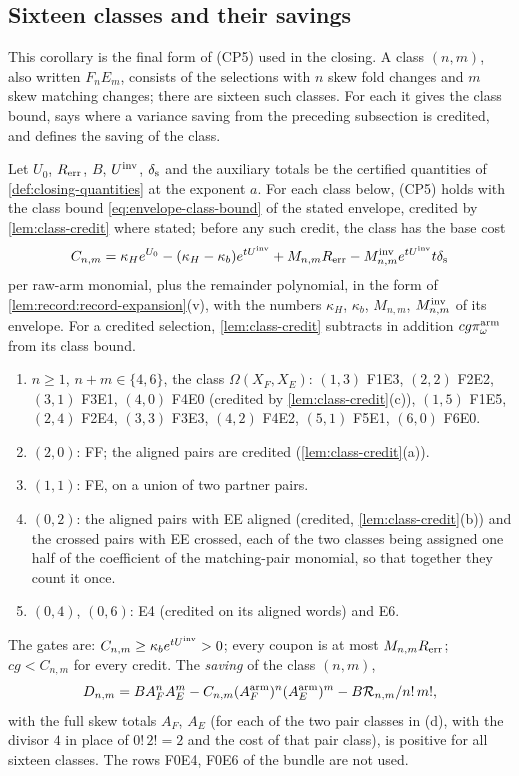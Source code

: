 \subsection{Sixteen classes and their savings}\label{subsec:envelope-costs}

This corollary is the final form of (CP5) used in the closing. A
class $(n,m)$, also written $F_nE_m$, consists of the selections
with $n$ skew fold changes and $m$ skew matching changes; there
are sixteen such classes. For each it gives the class bound, says
where a variance saving from the preceding subsection is credited,
and defines the saving of the class.

\begin{corollary}\label{cor:envelope-costs}
Let $U_0$, $R_{\rm err}$, $B$, $\Uinv$, $\delta_{\rm s}$ and the auxiliary totals be the
certified quantities of \cref{def:closing-quantities} at the exponent $a$. For each
class below, (CP5) holds with the class bound \eqref{eq:envelope-class-bound} of the
stated envelope, credited by \cref{lem:class-credit} where stated; before any such credit, the class has the base cost
\[
 C_{n,m}=\kappa_He^{U_0}-(\kappa_H-\kappa_b)e^{t\Uinv}+M_{n,m}R_{\rm err}
 -M^{\rm inv}_{n,m}e^{t\Uinv}t\delta_{\rm s}
\]
per raw-arm monomial, plus the remainder polynomial, in the form of
\cref{lem:record:record-expansion}(v), with the numbers $\kappa_H$, $\kappa_b$,
$M_{n,m}$, $M^{\rm inv}_{n,m}$ of its envelope. For a credited selection, \cref{lem:class-credit} subtracts in addition $cg\pi^{\rm arm}_\omega$ from its class bound.
\begin{enumerate}[label=(\alph*)]
\item $n\ge1$, $n+m\in\{4,6\}$, the class $\Omega(X_F,X_E)$: $(1,3)$ F1E3, $(2,2)$ F2E2,
 $(3,1)$ F3E1, $(4,0)$ F4E0 (credited by \cref{lem:class-credit}(c)), $(1,5)$ F1E5,
 $(2,4)$ F2E4, $(3,3)$ F3E3, $(4,2)$ F4E2, $(5,1)$ F5E1, $(6,0)$ F6E0.
\item $(2,0)$: FF; the aligned pairs are credited (\cref{lem:class-credit}(a)).
\item $(1,1)$: FE, on a union of two partner pairs.
\item $(0,2)$: the aligned pairs with EE aligned (credited,
 \cref{lem:class-credit}(b)) and the crossed pairs with EE crossed, each of the two classes being assigned one half of the coefficient of the matching-pair monomial, so that together they count it once.
\item $(0,4)$, $(0,6)$: E4 (credited on its aligned words) and E6.
\end{enumerate}
The gates are: $C_{n,m}\ge\kappa_be^{t\Uinv}>0$; every coupon is at most $M_{n,m}R_{\rm err}$;
$cg<C_{n,m}$ for every credit. The \emph{saving} of the class $(n,m)$,
\[
 D_{n,m}=\frac{BA_F^nA_E^m-C_{n,m}(A^{\rm arm}_F)^n(A^{\rm arm}_E)^m-B\mathcal R_{n,m}}{n!\,m!},
\]
with the full skew totals $A_F$, $A_E$ (for each of the two pair classes in (d), with the divisor $4$ in place of $0!\,2!=2$ and the cost of that pair class), is
positive for all sixteen classes. The rows F0E4, F0E6 of the bundle are not used.
\end{corollary}

